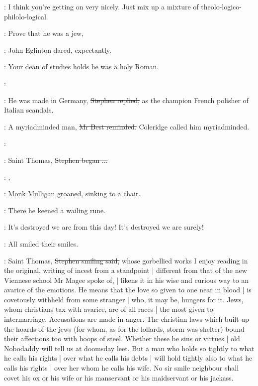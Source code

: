 \StephenInt:
I think you're getting on very nicely.
Just mix up a mixture of theolo-logico-philolo-logical.

\eglinton:
Prove that he was a jew,

:
John Eglinton dared, expectantly.

\eglinton:
Your dean of studies holds he was a holy Roman.

\StephenInt:

\Stephen:
He was made in Germany,
\sout{Stephen replied,}
as the champion French polisher of Italian scandals.

\best:
A myriadminded man,
\sout{Mr Best reminded.}
Coleridge called him myriadminded.

\StephenInt:

\Stephen:
Saint Thomas,
\sout{Stephen began ...}

\mulligan:
,

:
Monk Mulligan groaned,
sinking to a chair.

:
There he keened a wailing rune.

\mulligan:
It's destroyed we are from this day!
It's destroyed we are surely!

:
All smiled their smiles.

\Stephen:
Saint Thomas,
\sout{Stephen smiling said,}
whose gorbellied works I enjoy reading in the original,
writing of incest from a standpoint |
different from that of the new Viennese school Mr Magee spoke of, |
likens it in his wise and curious way to an avarice of the emotions.
He means that the love so given to one near in blood |
is covetously withheld from some stranger |
who, it may be,
hungers for it.
Jews, whom christians tax with avarice,
are of all races |
the most given to intermarriage.
Accusations are made in anger.
The christian laws which built up the hoards of the jews
(for whom,
as for the lollards,
storm was shelter)
bound their affections too with hoops of steel.
Whether these be sins or virtues |
old Nobodaddy will tell us at doomsday leet.
But a man who holds so tightly to what he calls his rights |
over what he calls his debts |
will hold tightly also to what he calls his rights |
over her whom he calls his wife.
No sir smile neighbour
shall covet his ox
or his wife
or his manservant
or his maidservant
or his jackass.

